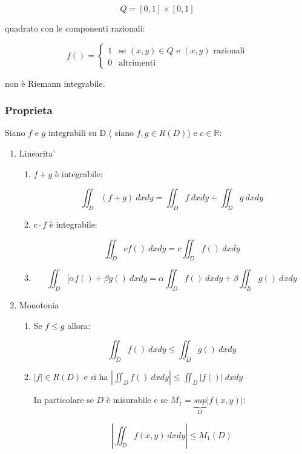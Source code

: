 \documentclass[../appunti-analisi.tex]{subfiles}
\begin{document}
\[
    Q = [0,1] \times [0,1]
\]

quadrato con le componenti razionali:

\[
    f() = \begin{cases}
        1 & \text{se $(x,y) \in Q$ e $(x,y)$ razionali} \\
         0 & \text{altrimenti}
    \end{cases}
\]

non è Riemann integrabile.


\subsubsection{Proprieta}

Siano $f$ e $g$ integrabili su D ( siano $f,g \in R(D)$) e $c \in \mathbb{R}$:

\begin{enumerate}
    \item Linearita'
        \begin{enumerate}
            \item $f+g$ è integrabile:

                \[
                    \iint_D {(f+g)} \: dx d y  = \iint_D {f} \: dx d y + \iint_D {g} \: dx d y 
                \]
            \item $c\cdot f$ è integrabile:

                \[
                    \iint_D {c f()} \: dx  d y = c \iint_D {f()} \: dx  d y 
                \]

            \item \[
                \iint_D {[\alpha f() + \beta g() } \: dx d y = \alpha \iint_D {f()} \: dx d y + \beta \iint_D {g()} \: dx d y 
            \]
        \end{enumerate}

    \item Monotonia
        \begin{enumerate}
            \item Se $f \le g$ allora:

                \[
                    \iint_D {f()} \: dx d y \le  \iint_D {g()} \: dx d y 
                \]
            \item $|f| \in R(D)$ e si ha $\left|\iint_D {f()} \: dx d y \right| \le \iint_D {\left|f()\right|} \: dx d y  $

                In particolare se $D$ è misurabile e se $M_1= \underbrace{sup}_\text{D} | f(x,y)|$:

                \[
                    \left|\iint_D {f(x,y)} \: dx d y\right| \le M_1(D)
                \]

        \end{enumerate}
        
\end{enumerate}
\end{document}
